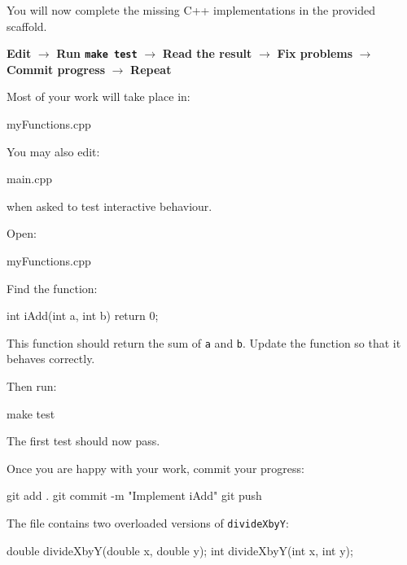 \documentclass{csc2059practical}
\begin{document}
You will now complete the missing C++ implementations in the provided scaffold.

\begin{workflowreminder}
\textbf{Edit} $\rightarrow$ \textbf{Run \texttt{make test}} $\rightarrow$ \textbf{Read the result} $\rightarrow$ \textbf{Fix problems} $\rightarrow$ \textbf{Commit progress} $\rightarrow$ \textbf{Repeat}
\end{workflowreminder}

Most of your work will take place in:

\begin{terminal}
myFunctions.cpp
\end{terminal}

You may also edit:

\begin{terminal}
main.cpp
\end{terminal}

when asked to test interactive behaviour.


Open:

\begin{terminal}
myFunctions.cpp
\end{terminal}

Find the function:

\begin{cppcode}
int iAdd(int a, int b)
{
    return 0;
}
\end{cppcode}

This function should return the sum of \texttt{a} and \texttt{b}. Update the function so that it behaves correctly.

Then run:

\begin{bashcode}
make test
\end{bashcode}

The first test should now pass.

Once you are happy with your work, commit your progress:

\begin{bashcode}
git add .
git commit -m "Implement iAdd"
git push
\end{bashcode}


The file contains two overloaded versions of \texttt{divideXbyY}:

\begin{cppcode}
double divideXbyY(double x, double y);
int divideXbyY(int x, int y);
\end{cppcode}
\end{document}
